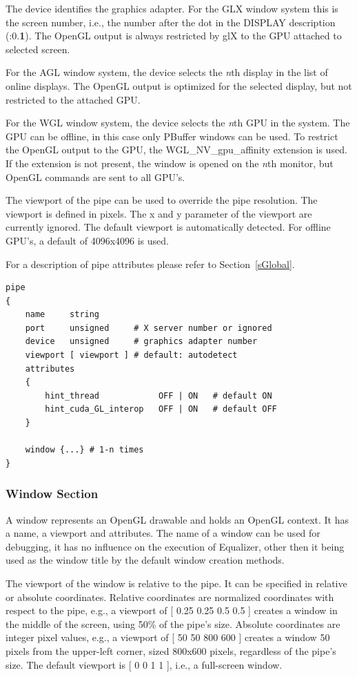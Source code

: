 \documentclass[10pt,a4]{scrartcl}
\newcommand{\sref}[1]{Section~\ref{#1}}
\begin{document}
The device identifies the graphics adapter. For the GLX window system
this is the screen number, i.e., the number after the dot in the DISPLAY
description (:0.\textbf{1}). The OpenGL output is always restricted by
glX to the GPU attached to selected screen.

For the AGL window system, the device selects the \textit{n}th display
in the list of online displays. The OpenGL output is optimized for the
selected display, but not restricted to the attached GPU.

For the WGL window system, the device selects the \textit{n}th GPU in
the system. The GPU can be offline, in this case only PBuffer windows
can be used. To restrict the OpenGL output to the GPU, the
\textsf{WGL\_NV\_gpu\_affinity} extension is used. If the extension is
not present, the window is opened on the \textit{n}th monitor, but
OpenGL commands are sent to all GPU's.

The viewport of the pipe can be used to override the pipe
resolution. The viewport is defined in pixels. The x and y parameter of
the viewport are currently ignored. The default viewport is
automatically detected. For offline GPU's, a default of 4096x4096 is
used.

For a description of pipe attributes please refer to \sref{sGlobal}.

{\footnotesize\begin{lstlisting}
pipe
{
    name     string
    port     unsigned     # X server number or ignored
    device   unsigned     # graphics adapter number
    viewport [ viewport ] # default: autodetect
    attributes
    {
        hint_thread            OFF | ON   # default ON
        hint_cuda_GL_interop   OFF | ON   # default OFF
    }

    window {...} # 1-n times
}
\end{lstlisting}}

\subsubsection{Window Section}

A window represents an OpenGL drawable and holds an OpenGL context. It
has a name, a viewport and attributes. The name of a window can be used
for debugging, it has no influence on the execution of Equalizer, other
then it being used as the window title by the default window creation
methods.

The viewport of the window is relative to the pipe. It can be specified
in relative or absolute coordinates. Relative coordinates are normalized
coordinates with respect to the pipe, e.g., a viewport of \textsf{[ 0.25
  0.25 0.5 0.5 ]} creates a window in the middle of the screen, using
50\% of the pipe's size. Absolute coordinates are integer pixel values,
e.g., a viewport of \textsf{[ 50 50 800 600 ]} creates a window 50 pixels
from the upper-left corner, sized 800x600 pixels, regardless of the
pipe's size. The default viewport is \textsf{[ 0 0 1 1 ]}, i.e., a
full-screen window. 
\end{document}
